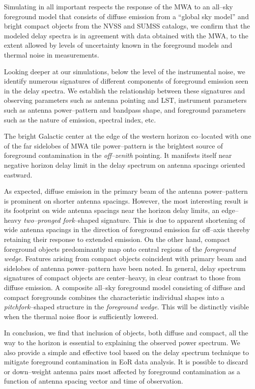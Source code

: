 \documentclass[preprint2,iop,numberedappendix]{emulateapj}
\begin{document}
Simulating in all important respects the response of the MWA to an all--sky foreground model that consists of diffuse emission from a ``global sky model'' and bright compact objects from the NVSS and SUMSS catalogs, we confirm that the modeled delay spectra is in agreement with data obtained with the MWA, to the extent allowed by levels of uncertainty known in the foreground models and thermal noise in measurements. 

Looking deeper at our simulations, below the level of the instrumental noise,  we identify numerous signatures of different components of foreground emission seen in the delay spectra. We establish the relationship between these signatures and observing parameters such as antenna pointing and LST, instrument parameters such as antenna power--pattern and bandpass shape, and foreground parameters such as the nature of emission, spectral index, etc. 

The bright Galactic center at the edge of the western horizon co--located with one of the far sidelobes of MWA tile power--pattern is the brightest source of foreground contamination in the {\it off--zenith} pointing. It manifests itself near negative horizon delay limit in the delay spectrum on antenna spacings oriented eastward. 

As expected, diffuse emission in the primary beam of the antenna power--pattern is prominent on shorter antenna spacings. However, the most interesting result is its footprint on wide antenna spacings near the horizon delay limits, an edge--heavy {\it two--pronged fork}--shaped signature. This is due to apparent shortening of wide antenna spacings in the direction of foreground emission far off--axis thereby retaining their response to extended emission. On the other hand, compact foreground objects predominantly map onto central regions of the {\it foreground wedge}. Features arising from compact objects coincident with primary beam and sidelobes of antenna power--pattern have been noted. In general, delay spectrum signatures of compact objects are center--heavy, in clear contrast to those from diffuse emission. A composite all--sky foreground model consisting of diffuse and compact foregrounds combines the characteristic individual shapes into a {\it pitchfork}--shaped structure in the {\it foreground wedge}. This will be distinctly visible when the thermal noise floor is sufficiently lowered. 

In conclusion, we find that inclusion of objects, both diffuse and compact, all the way to the horizon is essential to explaining the observed power spectrum. We also provide a simple and effective tool based on the delay spectrum technique to mitigate foreground contamination in EoR data analysis. It is possible to discard or down--weight antenna pairs most affected by foreground contamination as a function of antenna spacing vector and time of observation.
\end{document}

